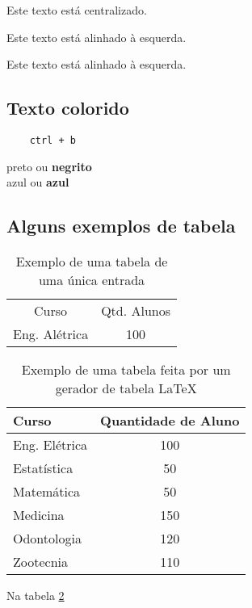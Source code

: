 \documentclass[a4paper, 11pt]{book}  %
\begin{document}
\begin{center}
    Este texto está centralizado.
\end{center}

\begin{flushleft}
   Este texto está alinhado à esquerda.
\end{flushleft}

\begin{flushright}
    Este texto está alinhado à esquerda.
\end{flushright}
    
\subsection{Texto colorido}

\begin{verbatim}
    ctrl + b 
\end{verbatim}

{\color{black} preto ou \textbf{negrito}} \\
{\color{blue} azul ou \textbf{azul}} \\


\subsection{Alguns exemplos de tabela}

\begin{table}[H]    %
    \centering
    \caption{Exemplo de uma tabela de uma única entrada}
    \begin{tabular}{c|c}
         Curso& Qtd. Alunos  \\
         Eng. Alétrica& 100 \\ 
    \end{tabular}
    \label{tab:my_label}
\end{table}

\begin{table}[H]
\centering
\caption{Exemplo de uma tabela feita por um gerador de tabela LaTeX}
\label{tab:curso}
\begin{tabular}{lc}
\hline
\hline
\textbf{Curso} & \textbf{Quantidade de Aluno} \\ \hline
Eng. Elétrica  & 100                          \\
Estatística    & 50                           \\
Matemática     & 50                           \\
Medicina       & 150                          \\
Odontologia    & 120                          \\
Zootecnia      & 110                          \\ \hline
\hline
\end{tabular}
\end{table}

Na tabela \ref{tab:curso}   %
\end{document}
